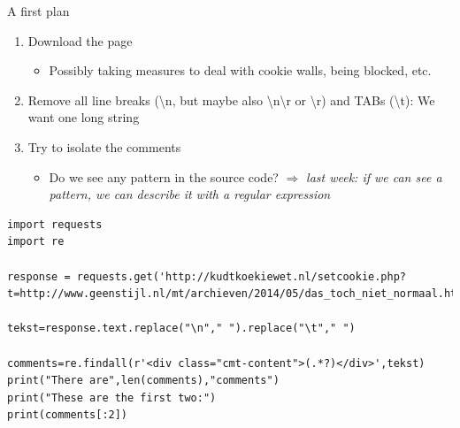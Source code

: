 \documentclass{beamer}
\begin{document}
\begin{frame}{}
\begin{block}{A first plan}
\begin{enumerate}
\item<2-> Download the page
   \begin{itemize}
   \item<3-> Possibly taking measures to deal with cookie walls, being blocked, etc.
   \end{itemize}
\item<4-> Remove all line breaks (\textbackslash n, but maybe also \textbackslash n\textbackslash r or \textbackslash r) and TABs (\textbackslash t): We want one long string
\item<5-> Try to isolate the comments
   \begin{itemize}
   	\item<5-> Do we see any pattern in the source code? $\Rightarrow$ \emph{last week: if we can see a pattern, we can describe it with a regular expression}
   \end{itemize}
\end{enumerate}
\end{block}

\end{frame}

\begin{frame}
\begin{lstlisting}
import requests
import re

response = requests.get('http://kudtkoekiewet.nl/setcookie.php?t=http://www.geenstijl.nl/mt/archieven/2014/05/das_toch_niet_normaal.html')

tekst=response.text.replace("\n"," ").replace("\t"," ")

comments=re.findall(r'<div class="cmt-content">(.*?)</div>',tekst)
print("There are",len(comments),"comments")
print("These are the first two:")
print(comments[:2])
\end{lstlisting}
\end{frame}
\end{document}
